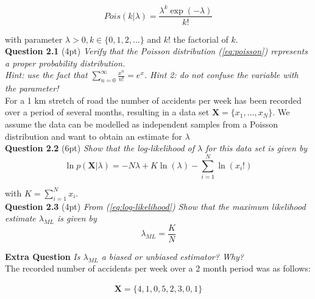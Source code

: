 \documentclass[a4paper]{article}
\begin{document}
\begin{equation}
\label{eq:poisson}
	Pois(k | \lambda) = \frac{\lambda^k \exp(-\lambda)}{k!}
\end{equation}

with parameter $\lambda > 0, k \in \{ 0,1,2,... \}$ and $k!$ the factorial of $k$.\\

\textbf{Question 2.1} (4pt) \textit{Verify that the Poisson distribution (\ref{eq:poisson}) represents a proper probability distribution.\\Hint: use the fact that $\sum_{n=0}^\infty \frac{x^n}{n!} = e^x$. Hint 2: do not confuse the variable with the parameter!}\\


For a 1 km stretch of road the number of accidents per week has been recorded over a period of several months, resulting in a data set $\textbf{X} = \{ x_1,..., x_N \}$. We assume the data can be modelled
as independent samples from a Poisson distribution and want to obtain an estimate for $\lambda$\\

\textbf{Question 2.2} (6pt) \textit{Show that the log-likelihood of $\lambda$ for this data set is given by}\\

\begin{equation}
\label{eq:log-likelihood}
\ln p(\textbf{X} | \lambda) = -N \lambda + K \ln(\lambda) - \sum_{i = 1}^N \ln(x_i!) 
\end{equation}

with $K = \sum_{i = 1}^N x_i$.\\


\textbf{Question 2.3} (4pt) \textit{From (\ref{eq:log-likelihood}) Show that the maximum likelihood estimate $\lambda_{ML}$ is given by}\\

\begin{equation}
\label{eq:MLE}
	\lambda_{ML} = \frac{K}{N}
\end{equation}

\textbf{Extra Question} \textit{Is $\lambda_{ML}$ a biased or unbiased estimator? Why?}\\


The recorded number of accidents per week over a 2 month period was as follows:

\begin{align*}
	\textbf{X} = \{ 4, 1, 0, 5, 2, 3, 0, 1\}
\end{align*}
\end{document}
